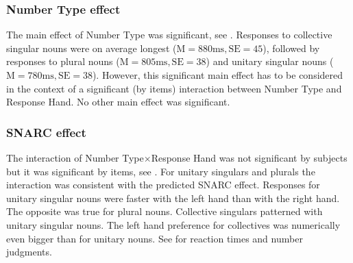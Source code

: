 \documentclass[output=paper]{langscibook}
\begin{document}
\subsubsection{Number Type effect}
The main effect of Number Type was significant, see . Responses to collective singular nouns were on average longest ($\text{M}=880\text{ms}, \text{SE}=45$), followed by responses to plural nouns ($\text{M}=805\text{ms}, \text{SE}=38$) and unitary singular nouns ($\text{M}=780\text{ms}, \text{SE}=38$). However, this significant main effect has to be considered in the context of a significant (by items) interaction between Number Type and Response Hand. No other main effect was significant.

\subsubsection{SNARC effect}
The interaction of Number Type×Response Hand was not significant by subjects but it was significant by items, see . For unitary singulars and plurals the interaction was consistent with the predicted SNARC effect. Responses for unitary singular nouns were faster with the left hand than with the right hand. The opposite was true for plural nouns. Collective singulars patterned with unitary singular nouns. The left hand preference for collectives was numerically even bigger than for unitary nouns. See  for reaction times and number judgments.

\end{document}

